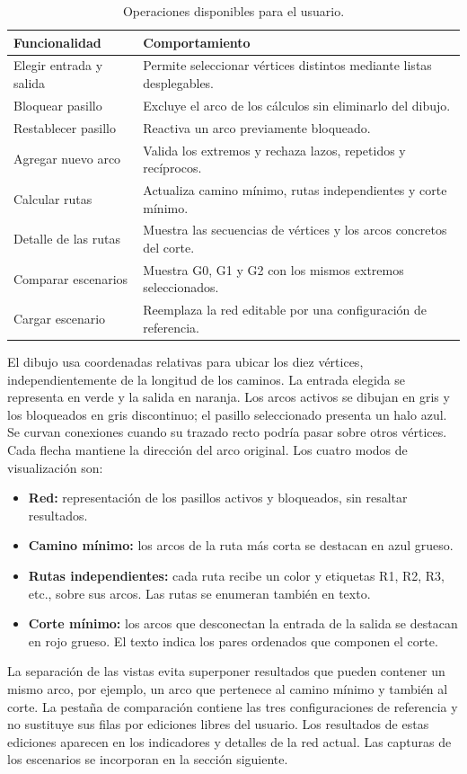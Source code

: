 \documentclass[11pt,a4paper]{article}
\begin{document}
\begin{table}[H]
\centering\small
\caption{Operaciones disponibles para el usuario.}
\begin{tabularx}{\textwidth}{>{\raggedright\arraybackslash}p{4.1cm}X}
\toprule
Funcionalidad & Comportamiento \\
\midrule
Elegir entrada y salida & Permite seleccionar vértices distintos mediante listas desplegables.\\
Bloquear pasillo & Excluye el arco de los cálculos sin eliminarlo del dibujo.\\
Restablecer pasillo & Reactiva un arco previamente bloqueado.\\
Agregar nuevo arco & Valida los extremos y rechaza lazos, repetidos y recíprocos.\\
Calcular rutas & Actualiza camino mínimo, rutas independientes y corte mínimo.\\
Detalle de las rutas & Muestra las secuencias de vértices y los arcos concretos del corte.\\
Comparar escenarios & Muestra G0, G1 y G2 con los mismos extremos seleccionados.\\
Cargar escenario & Reemplaza la red editable por una configuración de referencia.\\
\bottomrule
\end{tabularx}
\end{table}

El dibujo usa coordenadas relativas para ubicar los diez vértices, independientemente de la longitud de los caminos. La entrada elegida se representa en verde y la salida en naranja. Los arcos activos se dibujan en gris y los bloqueados en gris discontinuo; el pasillo seleccionado presenta un halo azul. Se curvan conexiones cuando su trazado recto podría pasar sobre otros vértices. Cada flecha mantiene la dirección del arco original. Los cuatro modos de visualización son:
\begin{itemize}[leftmargin=1.7em]
\item \textbf{Red:} representación de los pasillos activos y bloqueados, sin resaltar resultados.
\item \textbf{Camino mínimo:} los arcos de la ruta más corta se destacan en azul grueso.
\item \textbf{Rutas independientes:} cada ruta recibe un color y etiquetas R1, R2, R3, etc., sobre sus arcos. Las rutas se enumeran también en texto.
\item \textbf{Corte mínimo:} los arcos que desconectan la entrada de la salida se destacan en rojo grueso. El texto indica los pares ordenados que componen el corte.
\end{itemize}
La separación de las vistas evita superponer resultados que pueden contener un mismo arco, por ejemplo, un arco que pertenece al camino mínimo y también al corte. La pestaña de comparación contiene las tres configuraciones de referencia y no sustituye sus filas por ediciones libres del usuario. Los resultados de estas ediciones aparecen en los indicadores y detalles de la red actual. Las capturas de los escenarios se incorporan en la sección siguiente.
\end{document}
